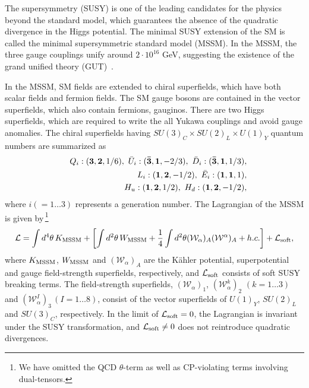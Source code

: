 \documentclass[preprint,3p,12pt]{elsarticle}
\begin{document}
{The supersymmetry (SUSY) is one of the leading candidates for the physics beyond the standard model, which guarantees the absence of the quadratic divergence in the Higgs potential. The minimal SUSY extension of the SM is called the minimal supersymmetric standard model (MSSM). In the MSSM, the three gauge couplings unify around $2\cdot 10^{16}$ GeV, suggesting the existence of the grand unified theory (GUT)~\cite{Georgi:1974sy, Pati:1974yy}.
 
In the MSSM, SM fields are extended to chiral superfields, which have both scalar fields and fermion fields. The SM gauge bosons are contained in the vector superfields, which also contain fermions, gauginos. There are two Higgs superfields, which are required to write the all %
Yukawa couplings and avoid gauge anomalies. The chiral superfields having $SU(3)_C \times SU(2)_L \times U(1)_Y$ quantum numbers are summarized as 
\begin{eqnarray}
&& Q_i: ({\bf 3}, {\bf 2},1/6), \ \bar U_i: ({\bf \bar 3}, {\bf 1}, -2/3), \  \bar D_i: ({\bf \bar 3}, {\bf 1}, 1/3),  \nonumber \\ 
&& L_i: ({\bf 1}, {\bf 2}, -1/2),  \ \bar E_i:({\bf 1},{\bf 1},1), \nonumber \\
&& H_u: ({\bf 1},{\bf 2},1/2), \ H_d:({\bf 1}, {\bf 2},-1/2),
\end{eqnarray}
where $i(=1 \dots 3)$ represents a generation number.
%
The Lagrangian of the MSSM is given by\,\footnote{
We have omitted the QCD $\theta$-term as well as CP-violating terms involving dual-tensors.
}
\begin{eqnarray}
\mathcal{L} = \int d^4 \theta \, K_{\rm MSSM}  + \left[ 
\int d^2 \theta \, W_{\rm MSSM}  + \frac{1}{4} \int d^2 \theta (\mathcal{W}_{\alpha})_A (\mathcal{W}^{\alpha})_A + h.c.
\right] + \mathcal{L}_{\rm soft},
\end{eqnarray}
where $K_{\rm MSSM}$, $W_{\rm MSSM}$ and $(\mathcal{W}_{\alpha})_A$
are the K{\" a}hler potential, superpotential and gauge field-strength superfields, respectively, 
and $\mathcal{L}_{\rm soft}$ consists of soft SUSY breaking terms. 
The field-strength superfields, $(\mathcal{W}_{\alpha})_1$, $(\mathcal{W}_{\alpha}^k)_2$ $(k=1\dots 3)$ and $(\mathcal{W}_{\alpha}^I)_3$\,$(I=1\dots 8)$, consist of the vector superfields of $U(1)_Y$, $SU(2)_L$ and $SU(3)_C$, respectively. 
In the limit of $\mathcal{L}_{\rm soft}=0$, the Lagrangian is invariant under the SUSY transformation, 
and $\mathcal{L}_{\rm soft} \neq 0$ does not reintroduce quadratic divergences.
%

}
\end{document}
